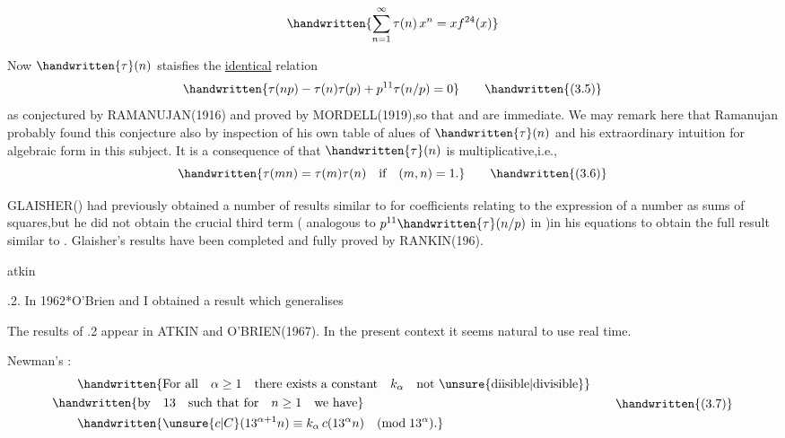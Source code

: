 \noindent\handwritten{\rule{\linewidth}{0.4pt}}

\[
\handwritten{\sum_{n=1}^{\infty}\tau(n)\,x^{n}=xf^{24}(x)}
\]

Now $\handwritten{\tau}(n)$ staisfies the \uline{identical} relation
\[
\handwritten{\tau(np)-\tau(n)\tau(p)+p^{11}\tau(n/p)=0}
\tag*{\handwritten{(3.5)}}
\]
as conjectured by RAMANUJAN(1916) and proved by MORDELL(1919),so that  and  are immediate. We may remark here that Ramanujan probably found this conjecture also by inspection of his own table of alues of $\handwritten{\tau}(n)$ and his extraordinary intuition for algebraic form in this subject. It is a consequence of  that $\handwritten{\tau}(n)$ is multiplicative,i.e.,
\[
\handwritten{\tau(mn)=\tau(m)\tau(n)\quad\text{if}\quad (m,n)=1.}
\tag*{\handwritten{(3.6)}}
\]

GLAISHER() had previously obtained a number of results similar to  for coefficients relating to the expression of a number as sums of squares,but he did not obtain the crucial third term ( analogous to $p^{11}\handwritten{\tau}(n/p)$ in )in his equations to obtain the full result similar to . Glaisher's results have been completed and fully proved by RANKIN(196\hspace{1em}).


\noindent\hfill atkin  

\noindent{}.2. In 1962*O'Brien and I obtained a result which generalises

\noindent\handwritten{\rule{\linewidth}{0.4pt}}

\noindent *The results of \handwritten{\S}.2 appear in ATKIN and O'BRIEN(1967). In the present context it seems natural to use real time.

\noindent\handwritten{\rule{\linewidth}{0.4pt}}

\noindent Newman's :
\[
\begin{aligned}
&\qquad\handwritten{\text{For all}\quad\alpha\geq1\quad\text{there exists a constant}\quad k_{\alpha}\quad\text{not \unsure{diisible|divisible}}}\\
&\handwritten{\text{by}\quad13\quad\text{such that for}\quad n\geq1\quad\text{we have}}\\
&\qquad\handwritten{\unsure{c|C}(13^{\alpha+1}n)\equiv k_{\alpha}\,c(13^{\alpha}n)\quad(\mathrm{mod}\;13^{\alpha}).}
\end{aligned}
\tag*{\handwritten{(3.7)}}
\]

